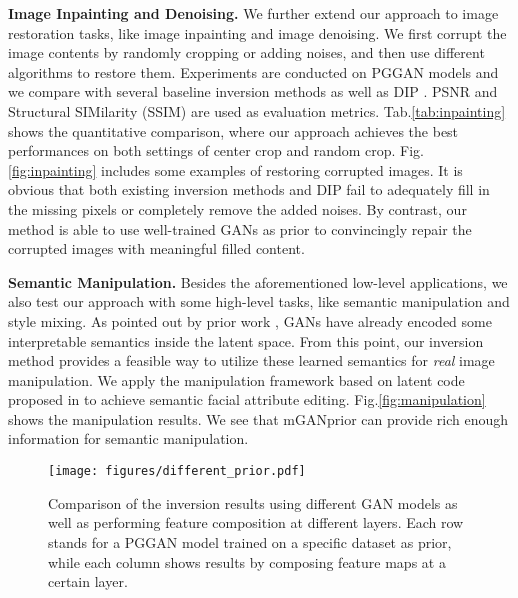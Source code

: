 \documentclass[10pt,twocolumn,letterpaper]{article}
\begin{document}
\vspace{2pt}\noindent\textbf{Image Inpainting and Denoising.}
We further extend our approach to image restoration tasks, like image inpainting and image denoising.
We first corrupt the image contents by randomly cropping or adding noises, and then use different algorithms to restore them.
Experiments are conducted on PGGAN models and we compare with several baseline inversion methods as well as DIP \cite{ulyanov2018deep}.
PSNR and Structural SIMilarity (SSIM) \cite{ssim} are used as evaluation metrics.
Tab.\ref{tab:inpainting} shows the quantitative comparison, where our approach achieves the best performances on both settings of center crop and random crop.
Fig.\ref{fig:inpainting} includes some examples of restoring corrupted images.
It is obvious that both existing inversion methods and DIP fail to adequately fill in the missing pixels or completely remove the added noises.
By contrast, our method is able to use well-trained GANs as prior to convincingly repair the corrupted images with meaningful filled content.


\vspace{2pt}\noindent\textbf{Semantic Manipulation.}
Besides the aforementioned low-level applications, we also test our approach with some high-level tasks, like semantic manipulation and style mixing.
As pointed out by prior work \cite{jahanian2020steerability,goetschalckx2019ganalyze,shen2020interpreting}, GANs have already encoded some interpretable semantics inside the latent space.
From this point, our inversion method provides a feasible way to utilize these learned semantics for \emph{real} image manipulation.
We apply the manipulation framework based on latent code proposed in \cite{shen2020interpreting} to achieve semantic facial attribute editing.
Fig.\ref{fig:manipulation} shows the manipulation results.
We see that mGANprior can provide rich enough information for semantic manipulation.


\begin{figure}[t]
  \centering
  \texttt{[image: figures/different\_prior.pdf]}
  \vspace{-20pt}
  \captionsetup{font=small}
  \caption{
    Comparison of the inversion results using different GAN models as well as performing feature composition at different layers.
Each row stands for a PGGAN model trained on a specific dataset as prior, while each column shows results by composing feature maps at a certain layer.
  }
  \label{fig:different-prior}
  \vspace{-15pt}
\end{figure}
\end{document}
